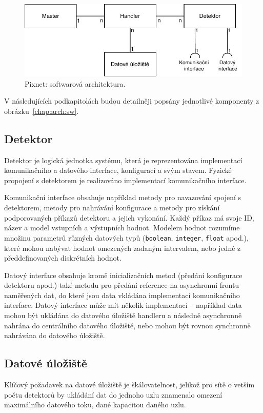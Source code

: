 \begin{figure}[h]
	\begin{center}
		\includegraphics[width=14.5cm]{figures/arch_sw.pdf}
		\caption{Pixnet: softwarová architektura.}
		\label{fig:arch:sw_architecture}
	\end{center}
\end{figure}

V následujících podkapitolách budou detailněji popsány jednotlivé komponenty z obrázku~\ref{chap:arch:sw}.
\subsection{Detektor}\label{chap:arch:sw:detector}
Detektor je logická jednotka systému, která je reprezentována implementací komunikačního a datového interface, konfigurací a svým stavem. Fyzické propojení s detektorem je realizováno implementací komunikačního interface.

Komunikační interface obsahuje například metody pro navazování spojení s detektorem, metody pro nahrávání konfigurace a metody pro získání podporovaných příkazů detektoru a jejich vykonání. Každý příkaz má svoje ID, název a model vstupních a výstupních hodnot. Modelem hodnot rozumíme množinu parametrů různých datových typů (\texttt{boolean}, \texttt{integer}, \texttt{float} apod.), které mohou nabývat hodnot omezených zadaným intervalem, nebo jedné z předdefinovaných diskrétních hodnot.

Datový interface obsahuje kromě inicializačních metod (předání konfigurace detektoru apod.) také metodu pro předání reference na asynchronní frontu naměřených dat, do které jsou data vkládána implementací komunikačního interface. Datový interface může mít několik implementací -- například data mohou být ukládána do datového úložiště handleru a následně asynchronně nahrána do centrálního datového úložiště, nebo mohou být rovnou synchronně nahrávána do datového úložiště.

\subsection{Datové úložiště}
Klíčový požadavek na datové úložiště je škálovatelnost, jelikož pro sítě o vetším počtu detektorů by ukládání dat do jednoho uzlu znamenalo omezení maximálního datového toku, dané kapacitou daného uzlu.

